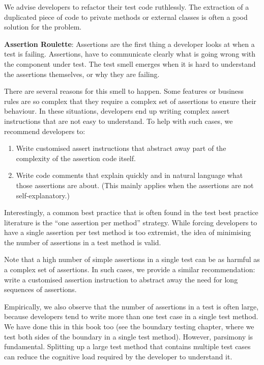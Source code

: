 We advise developers to refactor their test code ruthlessly. The
extraction of a duplicated piece of code to private methods or external
classes is often a good solution for the problem.

\textbf{Assertion Roulette}: Assertions are the first thing a developer
looks at when a test is failing. Assertions, have to communicate clearly
what is going wrong with the component under test. The test smell
emerges when it is hard to understand the assertions themselves, or why
they are failing.

There are several reasons for this smell to happen. Some features or
business rules are so complex that they require a complex set of
assertions to ensure their behaviour. In these situations, developers
end up writing complex assert instructions that are not easy to
understand. To help with such cases, we recommend developers to:

\begin{enumerate}
\def\labelenumi{\arabic{enumi}.}
\tightlist
\item
  Write customised assert instructions that abstract away part of the
  complexity of the assertion code itself.
\item
  Write code comments that explain quickly and in natural language what
  those assertions are about. (This mainly applies when the assertions
  are not self-explanatory.)
\end{enumerate}

Interestingly, a common best practice that is often found in the test
best practice literature is the ``one assertion per method'' strategy.
While forcing developers to have a single assertion per test method is
too extremist, the idea of minimising the number of assertions in a test
method is valid.

Note that a high number of simple assertions in a single test can be as
harmful as a complex set of assertions. In such cases, we provide a
similar recommendation: write a customised assertion instruction to
abstract away the need for long sequences of assertions.

Empirically, we also observe that the number of assertions in a test is
often large, because developers tend to write more than one test case in
a single test method. We have done this in this book too (see the
boundary testing chapter, where we test both sides of the boundary in a
single test method). However, parsimony is fundamental. Splitting up a
large test method that contains multiple test cases can reduce the
cognitive load required by the developer to understand it.

